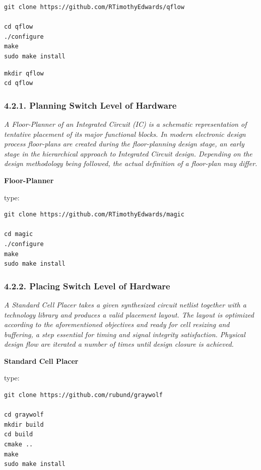 \documentclass[
]{article}
\begin{document}
\begin{verbatim}
git clone https://github.com/RTimothyEdwards/qflow

cd qflow
./configure
make
sudo make install
\end{verbatim}

\begin{verbatim}
mkdir qflow
cd qflow
\end{verbatim}

\hypertarget{planning-switch-level-of-hardware}{%
\subsubsection{4.2.1. Planning Switch Level of
Hardware}\label{planning-switch-level-of-hardware}}

\emph{A Floor-Planner of an Integrated Circuit (IC) is a schematic
representation of tentative placement of its major functional blocks. In
modern electronic design process floor-plans are created during the
floor-planning design stage, an early stage in the hierarchical approach
to Integrated Circuit design. Depending on the design methodology being
followed, the actual definition of a floor-plan may differ.}

\textbf{Floor-Planner}

type:

\begin{verbatim}
git clone https://github.com/RTimothyEdwards/magic

cd magic
./configure
make
sudo make install
\end{verbatim}

\hypertarget{placing-switch-level-of-hardware}{%
\subsubsection{4.2.2. Placing Switch Level of
Hardware}\label{placing-switch-level-of-hardware}}

\emph{A Standard Cell Placer takes a given synthesized circuit netlist
together with a technology library and produces a valid placement
layout. The layout is optimized according to the aforementioned
objectives and ready for cell resizing and buffering, a step essential
for timing and signal integrity satisfaction. Physical design flow are
iterated a number of times until design closure is achieved.}

\textbf{Standard Cell Placer}

type:

\begin{verbatim}
git clone https://github.com/rubund/graywolf

cd graywolf
mkdir build
cd build
cmake ..
make
sudo make install
\end{verbatim}
\end{document}
